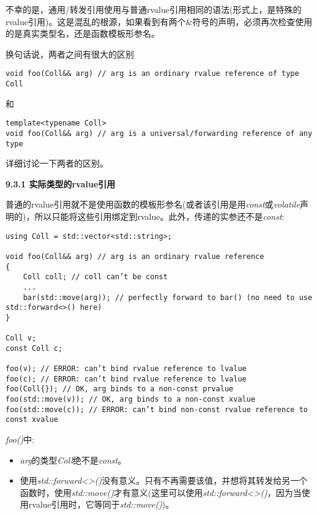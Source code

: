 不幸的是，通用/转发引用使用与普通rvalue引用相同的语法(形式上，是特殊的rvalue引用)。这是混乱的根源，如果看到有两个\&符号的声明，必须再次检查使用的是真实类型名，还是函数模板形参名。\par

换句话说，两者之间有很大的区别\par

\begin{lstlisting}[caption={}]
void foo(Coll&& arg) // arg is an ordinary rvalue reference of type Coll
\end{lstlisting}

和\par

\begin{lstlisting}[caption={}]
template<typename Coll>
void foo(Coll&& arg) // arg is a universal/forwarding reference of any type
\end{lstlisting}

详细讨论一下两者的区别。\par

\hspace*{\fill} \par %
\textbf{9.3.1 实际类型的rvalue引用}

普通的rvalue引用就不是使用函数的模板形参名(或者该引用是用\textit{const}或\textit{volatile}声明的)，所以只能将这些引用绑定到rvalue。此外，传递的实参还不是\textit{const}:\par

\begin{lstlisting}[caption={}]
using Coll = std::vector<std::string>;

void foo(Coll&& arg) // arg is an ordinary rvalue reference
{
	Coll coll; // coll can’t be const
	...
	bar(std::move(arg)); // perfectly forward to bar() (no need to use std::forward<>() here)
}

Coll v;
const Coll c;

foo(v); // ERROR: can’t bind rvalue reference to lvalue
foo(c); // ERROR: can’t bind rvalue reference to lvalue
foo(Coll{}); // OK, arg binds to a non-const prvalue
foo(std::move(v)); // OK, arg binds to a non-const xvalue
foo(std::move(c)); // ERROR: can’t bind non-const rvalue reference to const xvalue
\end{lstlisting}

\textit{foo()}中:\par

\begin{itemize}
	\item \textit{arg}的类型\textit{Coll}绝不是\textit{const}。
	\item 使用\textit{std::forward<>()}没有意义。只有不再需要该值，并想将其转发给另一个函数时，使用\textit{std::move()}才有意义(这里可以使用\textit{std::forward<>()}，因为当使用rvalue引用时，它等同于\textit{std::move()})。
\end{itemize}


